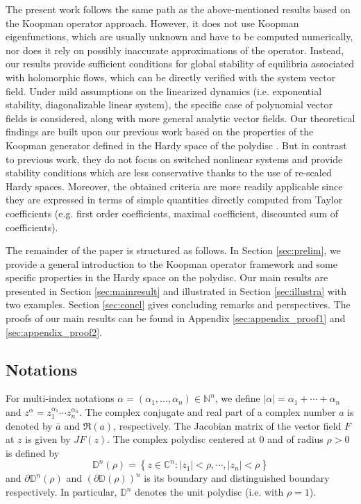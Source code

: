 \documentclass{article}
\begin{document}
The present work follows the same path as the above-mentioned results based on the Koopman operator approach. However, it does not use Koopman eigenfunctions, which are usually unknown and have to be computed numerically, nor does it rely on possibly inaccurate approximations of the operator. Instead, our results provide sufficient conditions for global stability of equilibria associated with holomorphic flows, which can be directly verified with the system vector field.
Under mild assumptions on the linearized dynamics (i.e. exponential stability, diagonalizable linear system), the specific case of polynomial vector fields is considered, along with more general analytic vector fields.
Our theoretical findings are built upon our previous work based on the properties of the Koopman generator defined in the Hardy space of the polydisc \cite{CMZAM2}. But in contrast to previous work, they do not focus on switched nonlinear systems and provide stability conditions which are less conservative thanks to the use of re-scaled Hardy spaces. Moreover, the obtained criteria are more readily applicable since they are expressed in terms of simple quantities directly computed from Taylor coefficients (e.g. first order coefficients, maximal coefficient, discounted sum of coefficients).



The remainder of the paper is structured as follows. In Section \ref{sec:prelim}, we provide a general introduction to the Koopman operator framework and some specific properties in the Hardy space on the polydisc. Our main results are presented in Section \ref{sec:mainresult} and illustrated in Section \ref{sec:illustra} with two examples. Section \ref{sec:concl} gives concluding remarks and perspectives. The proofs of our main results can be found in Appendix \ref{sec:appendix_proof1} and \ref{sec:appendix_proof2}.


\subsection*{Notations}
For multi-index notations  $\alpha = (\alpha_1 ,..., \alpha_n)\in \mathbb{N}^n$, we define $\vert\alpha\vert = \alpha_1+ \cdots + \alpha_n$ and $z^\alpha = z_1^{\alpha_1}\cdots z_n^{\alpha_n}$.
The complex conjugate and real part of a complex number $a$ is denoted by $\bar{a}$ and $\Re(a)$, respectively. 
The Jacobian matrix of the vector field $F$ at $z$ is given by $JF(z)$.
The complex polydisc centered at $0$ and of radius $\rho>0$ is defined by 
$$\mathbb{D}^n(\rho)=\left\lbrace z\in \mathbb{C}^n: | z_1|<\rho,\cdots, | z_n|<\rho  \right\rbrace$$
and $\partial \mathbb{D}^n(\rho)$ and $\left(\partial \mathbb{D}(\rho)\right)^n$ is its boundary and distinguished boundary respectively.
In particular, $\mathbb{D}^n$ denotes the unit polydisc (i.e. with $\rho=1$).
\end{document}
